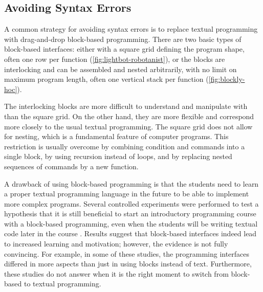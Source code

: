 \subsection{Avoiding Syntax Errors}
\label{sec:avoiding-syntax-errors}

A common strategy for avoiding syntax errors is to replace textual programming
with drag-and-drop block-based programming.
There are two basic types of block-based interfaces:
  either with a square grid defining the program shape,
  often one row per function
  (\cref{fig:lightbot-robotanist}),
  or the blocks are interlocking and can be assembled and nested arbitrarily,
  with no limit on maximum program length,
  often one vertical stack per function
  (\cref{fig:blockly-hoc}).

The interlocking blocks are more difficult to understand and manipulate with
  than the square grid.
On the other hand, they are more flexible
  and correspond more closely to the usual textual programming.
The square grid does not allow for nesting,
  which is a fundamental feature of computer programs.
This restriction is usually overcome by
  combining condition and commands into a single block,
  by using recursion instead of loops,
  and by replacing nested sequences of commands by a new function.


A drawback of using block-based programming
  is that the students need to learn a proper textual programming language in
  the future to be able to implement more complex programs.
Several controlled experiments were performed to test a hypothesis
  that it is still beneficial to start an introductory programming course
  with a block-based programming,
  even when the students will be writing textual code later in the course
  \cite{comparing-blocks-text-price2015, comparing-blocks-text-weintrop2017}.
Results suggest that block-based interfaces indeed lead to increased learning and
motivation; however, the evidence is not fully convincing. For example, in
some of these studies, the programming interfaces differed in more aspects than
just in using blocks instead of text. Furthermore, these studies do not
answer when it is the right moment to switch from block-based to textual
programming.

